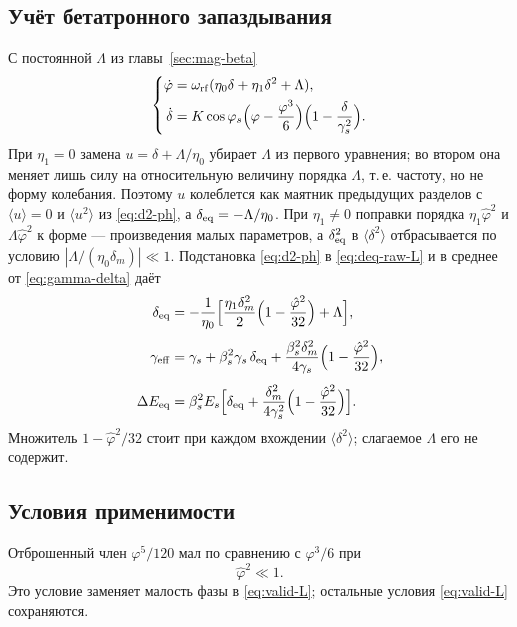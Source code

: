 \subsection{Учёт бетатронного запаздывания}

С постоянной $\Lambda$ из главы~\ref{sec:mag-beta}
\begin{equation}
\label{eq:system-phi-L}
\left\{
\begin{aligned}
\dot\varphi
&=\omega_{\mathrm{rf}}(\eta_0\delta+\eta_1\delta^2+\Lambda),\\
\dot\delta
&=K\cos\varphi_s\Bigl(\varphi-\frac{\varphi^3}{6}\Bigr)
\Bigl(1-\frac{\delta}{\gamma_s^2}\Bigr).
\end{aligned}
\right.
\end{equation}
При $\eta_1=0$ замена $u=\delta+\Lambda/\eta_0$ убирает $\Lambda$ из первого уравнения; во втором она меняет лишь силу на относительную величину порядка $\Lambda$, т.\,е. частоту, но не форму колебания. Поэтому $u$ колеблется как маятник предыдущих разделов с $\langle u\rangle=0$ и $\langle u^2\rangle$ из \eqref{eq:d2-ph}, а $\delta_{\mathrm{eq}}=-\Lambda/\eta_0$. При $\eta_1\neq 0$ поправки порядка $\eta_1\hat\varphi^2$ и $\Lambda\hat\varphi^2$ к форме --- произведения малых параметров, а $\delta_{\mathrm{eq}}^2$ в $\langle\delta^2\rangle$ отбрасывается по условию $|\Lambda/(\eta_0\delta_m)|\ll1$. Подстановка \eqref{eq:d2-ph} в \eqref{eq:deq-raw-L} и в среднее от \eqref{eq:gamma-delta} даёт
\begin{equation}
\label{eq:deq-ph-L}
\begin{aligned}
\delta_{\mathrm{eq}}
&=-\frac{1}{\eta_0}\Bigl[
\frac{\eta_1\delta_m^2}{2}\Bigl(1-\frac{\hat\varphi^2}{32}\Bigr)
+\Lambda
\Bigr],
\\[4pt]
\gamma_{\mathrm{eff}}
&=\gamma_s+\beta_s^2\gamma_s\,\delta_{\mathrm{eq}}
+\frac{\beta_s^2\delta_m^2}{4\gamma_s}
\Bigl(1-\frac{\hat\varphi^2}{32}\Bigr),
\\[4pt]
\Delta E_{\mathrm{eq}}
&=\beta_s^2 E_s\Bigl[
\delta_{\mathrm{eq}}
+\frac{\delta_m^2}{4\gamma_s^2}
\Bigl(1-\frac{\hat\varphi^2}{32}\Bigr)
\Bigr].
\end{aligned}
\end{equation}
Множитель $1-\hat\varphi^2/32$ стоит при каждом вхождении $\langle\delta^2\rangle$; слагаемое $\Lambda$ его не содержит.

\subsection{Условия применимости}

Отброшенный член $\varphi^5/120$ мал по сравнению с $\varphi^3/6$ при
\begin{equation}
\label{eq:valid-ph}
\hat\varphi^2\ll 1.
\end{equation}
Это условие заменяет малость фазы в \eqref{eq:valid-L}; остальные условия \eqref{eq:valid-L} сохраняются.
